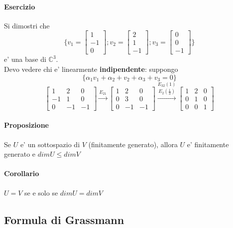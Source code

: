 \documentclass[a4paper, 10pt]{article}
\begin{document}
	\paragraph*{Esercizio} Si dimostri che 
	\[ \lbrace v_1 = \begin{bmatrix} 1 \\ -1 \\ 0 \end{bmatrix} ;
			   v_2 = \begin{bmatrix} 2 \\ 1 \\ -1 \end{bmatrix} ;
			   v_3 = \begin{bmatrix} 0 \\ 0 \\ -1 \end{bmatrix}
	   \rbrace \] e' una base di $\mathbb{C}^3$.\\
	   Devo vedere chi e' linearmente \textbf{indipendente}: suppongo 
	   \[ \lbrace \alpha_1 v_1 + \alpha_2 + v_2 + \alpha_3 + v_3 = 0 \rbrace \]
	   \[ \begin{bmatrix}
	   		1 & 2 & 0 \\
	   		-1 & 1 & 0 \\
	   		0 & -1 & -1
	   	  \end{bmatrix} \stackrel{E_{21}}{\longrightarrow}
	   	  \begin{bmatrix}
	   		1 & 2 & 0 \\
	   		0 & 3 & 0 \\
	   		0 & -1 & -1
	   	  \end{bmatrix} \stackrel{E_{32}(1)}{\stackrel{E_2(\frac{1}{3})}{\longrightarrow}}
	   	  \begin{bmatrix}
	   		1 & 2 & 0 \\
	   		0 & 1 & 0 \\
	   		0 & 0 & 1
	   	  \end{bmatrix}
	   	\]
	
	\paragraph*{Proposizione} Se $U$ e' un sottospazio di $V$ (finitamente generato), 
							  allora $U$ e' finitamente generato e $dimU \leq dimV$
	\paragraph*{Corollario} $U=V$ se e solo se $dimU = dimV$

	\subsection{Formula di Grassmann}
\end{document}
